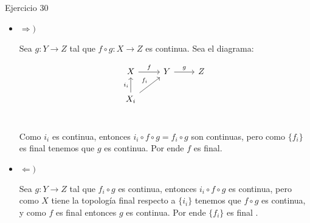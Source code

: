 \documentclass[11pt]{article}
\newcommand{\sett}[1]{\{#1\}}
\newenvironment{proof}[1][Demostraci\'on]{\begin{trivlist}
\item[\hskip \labelsep {\bfseries #1}]}{\end{trivlist}}
\newcommand{\qed}{\nobreak \ifvmode \relax \else
      \ifdim\lastskip<1.5em \hskip-\lastskip
      \hskip1.5em plus0em minus0.5em \fi \nobreak
      \vrule height0.75em width0.5em depth0.25em\fi}
\begin{document}
\begin{enumerate}
\begin{proof}
\end{proof}

\item {Ejercicio 30}

\begin{proof}

\begin{itemize}

\item {$\Longrightarrow)$} 

Sea $g : Y \rightarrow Z$ tal que $f \circ g : X \rightarrow Z$ es continua. Sea el diagrama:

\[
\begin{tikzcd}
X \arrow{r}{f} & Y \arrow{r}{g} & Z \\
X_i \arrow{u}{i_i} \arrow{ur}{f_i} & \\
\end{tikzcd}
\]

Como $i_i$ es continua, entonces $i_i \circ f \circ g = f_i \circ g$ son continuas, pero como $\sett{f_i}$ es final tenemos que $g$ es continua. Por ende $f$ es final.

\item {$\Longleftarrow)$}

Sea $g : Y \rightarrow Z$ tal que $f_i \circ g$ es continua, entonces $i_i \circ f \circ g$ es continua, pero como $X$ tiene la topolog\'ia final respecto a $\sett{i_i}$ tenemos que $f \circ g$ es continua, y como $f$ es final entonces $g$  es continua. Por ende $\sett{f_i}$ es final . \qed

\end{itemize}

\end{proof}

\end{enumerate}
\end{document}
